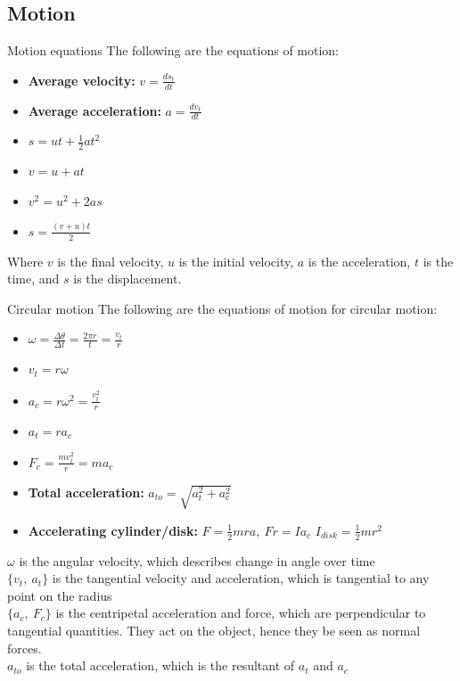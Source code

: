 \subsection{Motion}
\begin{theorem}
    {Motion equations}
    The following are the equations of motion:
    \begin{itemize}
        \item \textbf{Average velocity: }$v=\frac{ds_t}{dt}$
        \item \textbf{Average acceleration: }$a=\frac{dv_t}{dt}$
        \item $s=ut+\frac{1}{2}at^2$
        \item $v=u+at$
        \item $v^2=u^2+2as$
        \item $s=\frac{(v+u)t}{2}$
    \end{itemize}
    Where $v$ is the final velocity, $u$ is the initial velocity, $a$ is the acceleration, $t$ is the time, and $s$ is the displacement.
\end{theorem}

\begin{theorem}
    {Circular  motion}
    The following are the equations of motion for circular motion:
    \begin{itemize}
        \item $\omega = \frac{\Delta\theta}{\Delta t}=\frac{2\pi r}{t} = \frac{v_t}{r}$
        \item $v_t = r\omega$
        \item $a_c = r\omega^2 = \frac{v_t^2}{r}$
        \item $a_t = r a_c$
        \item $F_c = \frac{mv_t^2}{r} = ma_c$
        \item \textbf{Total acceleration: }$a_{to} = \sqrt{a_t^2+a_c^2}$
        \item \textbf{Accelerating cylinder/disk: }$F = \frac12mra,\ Fr=Ia_c$
              $I_{disk}=\frac12mr^2$
    \end{itemize}
    \tcblower
    $\omega$ is the angular velocity, which describes change in angle over time\\
    $\{v_t,\ a_t\}$ is the tangential velocity and acceleration, which is tangential to any point on the radius\\
    $\{a_c,\ F_c\}$ is the centripetal acceleration and force, which are perpendicular to tangential quantities. They act on the object, hence they be seen as normal forces.\\
    $a_{to}$ is the total acceleration, which is the resultant of $a_t$ and $a_c$
\end{theorem}

